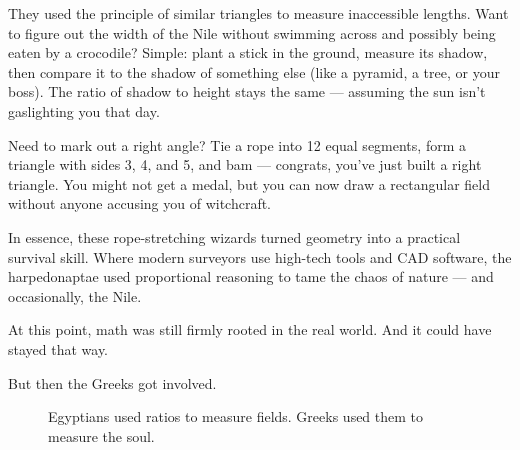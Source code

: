 They used the principle of similar triangles to measure inaccessible lengths. Want to figure out the width of the Nile without swimming across and possibly being eaten by a crocodile? Simple: plant a stick in the ground, measure its shadow, then compare it to the shadow of something else (like a pyramid, a tree, or your boss). The ratio of shadow to height stays the same --- assuming the sun isn’t gaslighting you that day.

Need to mark out a right angle? Tie a rope into 12 equal segments, form a triangle with sides 3, 4, and 5, and bam --- congrats, you’ve just built a right triangle. You might not get a medal, but you can now draw a rectangular field without anyone accusing you of witchcraft. 

In essence, these rope-stretching wizards turned geometry into a practical survival skill. Where modern surveyors use high-tech tools and CAD software, the harpedonaptae used proportional reasoning to tame the chaos of nature --- and occasionally, the Nile.



At this point, math was still firmly rooted in the real world. And it could have stayed that way.  

But then the Greeks got involved.  

\begin{figure}[H]
\centering
{}
\caption{Egyptians used ratios to measure fields. Greeks used them to measure the soul.}
\end{figure}